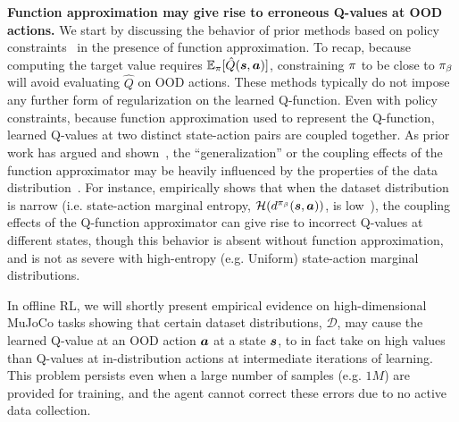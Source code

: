 \textbf{Function approximation may give rise to erroneous Q-values at OOD actions.} We start by discussing the behavior of prior methods based on policy constraints~\citep{kumar2019stabilizing,fujimoto2018off,jaques2019way,wu2019behavior} in the presence of function approximation.
To recap, because computing the target value requires $\mathbb{E}_\pi[\hat{Q}(\boldsymbol{s},\boldsymbol{a})]$, constraining $\pi$ to be close to ${\pi_\beta}$ will avoid evaluating $\hat{Q}$ on OOD actions. These methods typically do not impose any further form of regularization on the learned Q-function.
Even with policy constraints, because function approximation used to represent the Q-function, learned Q-values at two distinct state-action pairs are coupled together. As prior work has argued and shown~\citep{achiam2019towards,fu2019diagnosing,kumar2020discor}, the ``generalization'' or the coupling effects of the function approximator may be heavily influenced by the properties of the data distribution~\citep{fu2019diagnosing,kumar2020discor}. For instance, \citet{fu2019diagnosing} empirically shows that when the dataset distribution is narrow (i.e. state-action marginal entropy, $\mathcal{H}(d^{\pi_\beta}(\boldsymbol{s}, \boldsymbol{a}))$, is low~\citep{fu2019diagnosing}), the coupling effects of the Q-function approximator can give rise to incorrect Q-values at different states, though this behavior is absent without function approximation, and is not as severe with high-entropy (e.g. Uniform) state-action marginal distributions.

In offline RL, we will shortly present empirical evidence on high-dimensional MuJoCo tasks showing that certain dataset distributions, $\mathcal{D}$, may cause the learned Q-value at an OOD action $\boldsymbol{a}$ at a state $\boldsymbol{s}$, to in fact take on high values than Q-values at in-distribution actions at intermediate iterations of learning. This problem persists even when a large number of samples (e.g. $1M$) are provided for training, and the agent cannot correct these errors due to no active data collection.  

